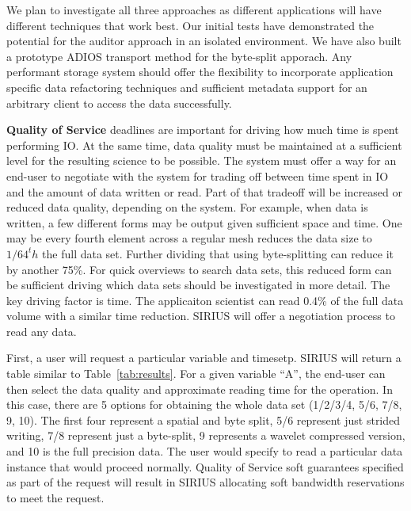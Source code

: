 \documentclass[letterpaper,twocolumn,10pt]{article}
\begin{document}
We plan to investigate all three approaches as different applications will have
different techniques that work best. Our initial tests have demonstrated the
potential for the auditor approach in an isolated environment. We have also
built a prototype ADIOS transport method for the byte-split apporach. Any
performant storage system should offer the flexibility to incorporate
application specific data refactoring techniques and sufficient metadata
support for an arbitrary client to access the data successfully.

\noindent\textbf{Quality of Service} deadlines are important for driving how
much time is spent performing IO. At the same time, data quality must be
maintained at a sufficient level for the resulting science to be possible.
The system must offer a way for an end-user to negotiate with the system for
trading off between time spent in IO and the amount of data written or read.
Part of that tradeoff will be increased or reduced data quality, depending on
the system. For example, when data is written, a few different forms may be
output given sufficient space and time. One may be every fourth element
across a regular mesh reduces the data size to $1/64^th$ the full data set.
Further dividing that using byte-splitting can reduce it by another 75\%. For
quick overviews to search data sets, this reduced form can be sufficient
driving which data sets should be investigated in more detail. The key driving
factor is time. The applicaiton scientist can read 0.4\% of the full data
volume with a similar time reduction. SIRIUS will offer a negotiation process
to read any data.

First, a user will request a particular variable and timesetp. SIRIUS will
return a table similar to Table~\ref{tab:results}. For a given variable ``A'',
the end-user can then select the data quality and approximate reading time for
the operation. In this case, there are 5 options for obtaining the whole data
set (1/2/3/4, 5/6, 7/8, 9, 10). The first four represent a spatial and byte
split, 5/6 represent just strided writing, 7/8 represent just a byte-split, 9
represents a wavelet compressed version, and 10 is the full precision data.
The user would specify to read a particular data instance that would proceed
normally.  Quality of Service soft guarantees specified as part of the request
will result in SIRIUS allocating soft bandwidth reservations to meet the
request.
\end{document}
